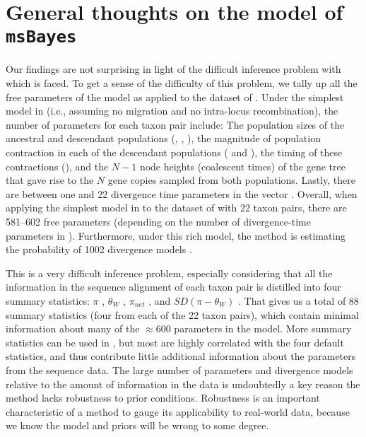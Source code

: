 \section{General thoughts on the model of \texttt{msBayes}}
Our findings are not surprising in light of the difficult inference problem
with which \msb is faced.
To get a sense of the difficulty of this problem, we tally up all the free
parameters of the \msb model as applied to the dataset of \citet{Oaks2012}.
Under the simplest model in \msb (i.e., assuming no migration and no
intra-locus recombination), the number of parameters for each taxon pair
include:
The population sizes of the ancestral and descendant populations
(\ancestralTheta{}, , ),
the magnitude of population contraction in each of the descendant
populations ( and ), the
timing of these contractions (\bottleTime{}), and the $N-1$ node heights
(coalescent times) of the gene tree that gave rise to the $N$ gene
copies sampled from both populations.
Lastly, there are between one and 22 divergence time parameters \divt{} in
the vector \divtvector.
Overall, when applying the simplest model in \msb to the dataset of
\citet{Oaks2012} with 22 taxon pairs, there are 581--602 free parameters
(depending on the number of divergence-time parameters in \divtvector).
Furthermore, under this rich model, the method is estimating the probability of
1002 divergence models \citep[i.e., the number of integer partitions of
$Y=22$;][]{Oaks2012}.

This is a very difficult inference problem, especially considering that all the
information in the sequence alignment of each taxon pair is distilled into four
summary statistics:
$\pi$ \citep{Tajima1983}, $\theta_W$ \citep{Watterson1975}, $\pi_{net}$
\citep{Takahata1985}, and $SD(\pi-\theta_W)$ \citep{Tajima1989}.
That gives us a total of 88 summary statistics (four from each of the 22 taxon
pairs), which contain minimal information about many of the $\approx 600$
parameters in the model.
More summary statistics can be used in \msb, but most are highly correlated
with the four default statistics, and thus contribute little additional
information about the parameters from the sequence data.
The large number of parameters and divergence models relative to the amount of
information in the data is undoubtedly a key reason the method lacks robustness
to prior conditions.
Robustness is an important characteristic of a method to gauge its
applicability to real-world data, because we know the model and priors will be
wrong to some degree.

